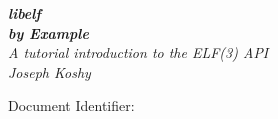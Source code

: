 \pagestyle{empty}
\raggedleft
\vspace*{\baselineskip}
{\Huge \itshape {\bfseries libelf} \\[0.2\baselineskip]
 \itshape \bfseries by Example}\\[2.2\baselineskip]
{\LARGE\itshape A tutorial introduction to the ELF(3) API}\\[0.45\textheight]
{\LARGE\itshape Joseph Koshy}\par
\vfill
{\small Document Identifier: \texttt{}\unskip}
